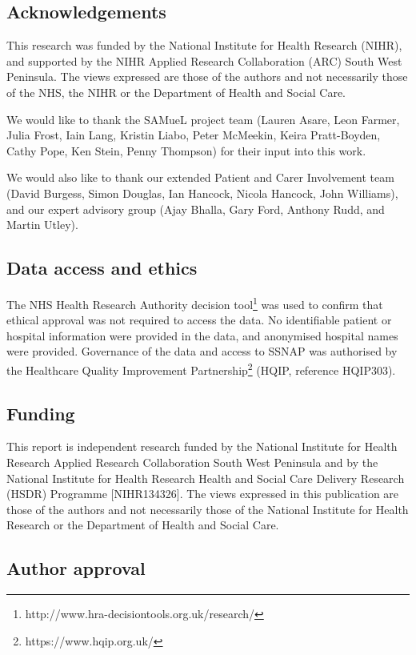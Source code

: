 \subsection*{Acknowledgements}

This research was funded by the National Institute for Health Research (NIHR), and supported by the NIHR Applied Research Collaboration (ARC) South West Peninsula. The views expressed are those of the authors and not necessarily those of the NHS, the NIHR or the Department of Health and Social Care.

We would like to thank the SAMueL project team (Lauren Asare, Leon Farmer, Julia Frost,  Iain Lang, Kristin Liabo, Peter McMeekin, Keira Pratt-Boyden, Cathy Pope, Ken Stein, Penny Thompson) for their input into this work.

We would also like to thank our extended Patient and Carer Involvement team (David Burgess, Simon Douglas, Ian Hancock, Nicola Hancock, John Williams), and our expert advisory group (Ajay Bhalla, Gary Ford, Anthony Rudd, and Martin Utley).

\subsection*{Data access and ethics}

The NHS Health Research Authority decision tool\footnote{http://www.hra-decisiontools.org.uk/research/} was used to confirm that ethical approval was not required to access the data. No identifiable patient or hospital information were provided in the data, and anonymised hospital names were provided. Governance of the data and access to SSNAP was authorised by the Healthcare Quality Improvement Partnership\footnote{https://www.hqip.org.uk/} (HQIP, reference HQIP303). 

\subsection*{Funding}

This report is independent research funded by the National Institute for Health Research Applied Research Collaboration South West Peninsula and by the National Institute for Health Research Health and Social Care Delivery Research (HSDR) Programme [NIHR134326]. The views expressed in this publication are those of the authors and not necessarily those of the National Institute for Health Research or the Department of Health and Social Care.

\subsection*{Author approval}

